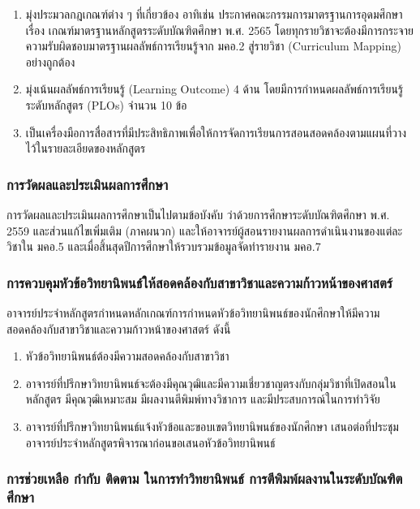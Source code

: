 \begin{enumerate}
   	\item มุ่งประมวลกฎเกณฑ์ต่าง ๆ ที่เกี่ยวข้อง อาทิเช่น ประกาศคณะกรรมการมาตรฐานการอุดมศึกษา เรื่อง เกณฑ์มาตรฐานหลักสูตรระดับบัณฑิตศึกษา พ.ศ. 2565 โดยทุกรายวิชาจะต้องมีการกระจายความรับผิดชอบมาตรฐานผลลัพธ์การเรียนรู้จาก มคอ.2 สู่รายวิชา (Curriculum Mapping) อย่างถูกต้อง
  
   	  	\item มุ่งเน้นผลลัพธ์การเรียนรู้ (Learning Outcome) 4 ด้าน โดยมีการกำหนดผลลัพธ์การเรียนรู้ระดับหลักสูตร (PLOs) จำนวน 10 ข้อ
   	    	
   	\item  เป็นเครื่องมือการสื่อสารที่มีประสิทธิภาพเพื่อให้การจัดการเรียนการสอนสอดคล้องตามแผนที่วางไว้ในรายละเอียดของหลักสูตร
   	\end{enumerate} 

\subsubsection{การวัดผลและประเมินผลการศึกษา}
การวัดผลและประเมินผลการศึกษาเป็นไปตามข้อบังคับ\university{} ว่าด้วยการศึกษาระดับบัณฑิตศึกษา พ.ศ. 2559 และส่วนแก้ไขเพิ่มเติม (ภาคผนวก) และให้อาจารย์ผู้สอนรายงานผลการดำเนินงานของแต่ละวิชาใน มคอ.5 และเมื่อสิ้นสุดปีการศึกษาให้รวบรวมข้อมูลจัดทำรายงาน มคอ.7

\subsubsection{การควบคุมหัวข้อวิทยานิพนธ์ให้สอดคล้องกับสาขาวิชาและความก้าวหน้าของศาสตร์}

อาจารย์ประจำหลักสูตรกำหนดหลักเกณฑ์การกำหนดหัวข้อวิทยานิพนธ์ของนักศึกษาให้มีความสอดคล้องกับสาขาวิชาและความก้าวหน้าของศาสตร์ ดังนี้
  \begin{enumerate}
   	\item หัวข้อวิทยานิพนธ์ต้องมีความสอดคล้องกับสาขาวิชา\thdegreebranch
   	\item อาจารย์ที่ปรึกษาวิทยานิพนธ์จะต้องมีคุณวุฒิและมีความเชี่ยวชาญตรงกับกลุ่มวิชาที่เปิดสอนในหลักสูตร มีคุณวุฒิเหมาะสม มีผลงานตีพิมพ์ทางวิชาการ และมีประสบการณ์ในการทำวิจัย   	
   	\item  อาจารย์ที่ปรึกษาวิทยานิพนธ์แจ้งหัวข้อและขอบเขตวิทยานิพนธ์ของนักศึกษา เสนอต่อที่ประชุมอาจารย์ประจำหลักสูตรพิจารณาก่อนขอเสนอหัวข้อวิทยานิพนธ์  	
   	\end{enumerate}  

\subsubsection{การช่วยเหลือ กำกับ ติดตาม ในการทำวิทยานิพนธ์ การตีพิมพ์ผลงานในระดับบัณฑิตศึกษา}

